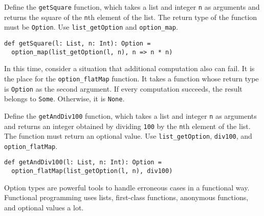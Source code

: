 Define the \verb!getSquare! function, which takes a list and integer \verb!n! as
arguments and returns the square of the \verb!n!th element of the list. The
return type of the function must be \verb!Option!. Use \verb!list_getOption! and
\verb!option_map!.

\begin{verbatim}
def getSquare(l: List, n: Int): Option =
  option_map(list_getOption(l, n), n => n * n)
\end{verbatim}

In this time, consider a situation that additional computation also can fail. It
is the place for the \verb!option_flatMap! function. It takes a function whose
return type is \verb!Option! as the second argument. If every computation
succeeds, the result belongs to \verb!Some!. Otherwise, it is \verb!None!.

Define the \verb!getAndDiv100! function, which takes a list and integer \verb!n!
as arguments and returns an integer obtained by dividing \verb!100! by the
\verb!n!th element of the list. The function must return an optional value. Use
\verb!list_getOption!, \verb!div100!, and \verb!option_flatMap!.

\begin{verbatim}
def getAndDiv100(l: List, n: Int): Option =
  option_flatMap(list_getOption(l, n), div100)
\end{verbatim}

Option types are powerful tools to handle erroneous cases in a functional way.
Functional programming uses lists, first-class functions, anonymous functions,
and optional values a lot.
